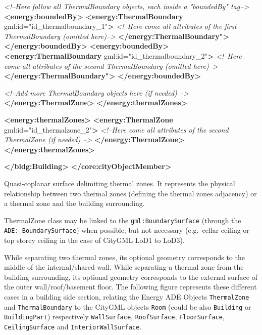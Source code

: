 \documentclass[a4paper,12pt]{article}
\newenvironment{Shaded}{}{}
\newcommand{\KeywordTok}[1]{\textcolor[rgb]{0.00,0.44,0.13}{\textbf{{#1}}}}
\newcommand{\StringTok}[1]{\textcolor[rgb]{0.25,0.44,0.63}{{#1}}}
\newcommand{\CommentTok}[1]{\textcolor[rgb]{0.38,0.63,0.69}{\textit{{#1}}}}
\newcommand{\OtherTok}[1]{\textcolor[rgb]{0.00,0.44,0.13}{{#1}}}
\newcommand{\ErrorTok}[1]{\textcolor[rgb]{1.00,0.00,0.00}{\textbf{{#1}}}}
\begin{document}
\begin{Shaded}
\begin{Highlighting}[]
                \CommentTok{<!--Here follow all ThermalBoundary objects, each inside a "boundedBy" tag-->}
                \KeywordTok{<energy:boundedBy>}
                    \KeywordTok{<energy:ThermalBoundary}\OtherTok{ gml:id=}\StringTok{"id_thermalboundary_1"}\KeywordTok{>}
                        \CommentTok{<!--Here come all attributes of the first ThermalBoundary (omitted here)-->}
                    \KeywordTok{</energy:ThermalBoundary}\ErrorTok{"}\KeywordTok{>}
                \KeywordTok{</energy:boundedBy>}
                \KeywordTok{<energy:boundedBy>}
                    \KeywordTok{<energy:ThermalBoundary}\OtherTok{ gml:id=}\StringTok{"id_thermalboundary_2"}\KeywordTok{>}
                        \CommentTok{<!--Here come all attributes of the second ThermalBoundary (omitted here)-->}
                    \KeywordTok{</energy:ThermalBoundary}\ErrorTok{"}\KeywordTok{>}
                \KeywordTok{</energy:boundedBy>}
                
                \CommentTok{<!--Add more ThermalBoundary objects here (if needed) -->}
            \KeywordTok{</energy:ThermalZone>}
        \KeywordTok{</energy:thermalZones>}

        \KeywordTok{<energy:thermalZones>}
            \KeywordTok{<energy:ThermalZone}\OtherTok{ gml:id=}\StringTok{"id_thermalzone_2"}\KeywordTok{>}
                \CommentTok{<!--Here come all attributes of the second ThermalZone (if needed) -->}
            \KeywordTok{</energy:ThermalZone>}               
        \KeywordTok{</energy:thermalZones>}

        \KeywordTok{</bldg:Building>}
\KeywordTok{</core:cityObjectMember>}
\end{Highlighting}
\end{Shaded}

Quasi-coplanar surface delimiting thermal zones. It represents the
physical relationship between two thermal zones (defining the thermal
zones adjacency) or a thermal zone and the building surrounding.

ThermalZone class may be linked to the \texttt{gml:BoundarySurface}
(through the \texttt{ADE:\_BoundarySurface}) when possible, but not
necessary (e.g.~cellar ceiling or top storey ceiling in the case of
CityGML LoD1 to LoD3).

While separating two thermal zones, its optional geometry corresponds to
the middle of the internal/shared wall. While separating a thermal zone
from the building surrounding, its optional geometry corresponds to the
external surface of the outer wall/roof/basement floor. The following
figure represents these different cases in a building side section,
relating the Energy ADE Objects \texttt{ThermalZone} and
\texttt{ThermalBoundary} to the CityGML objects \texttt{Room} (could be
also \texttt{Building} or \texttt{BuildingPart}) respectively
\texttt{WallSurface}, \texttt{RoofSurface}, \texttt{FloorSurface},
\texttt{CeilingSurface} and \texttt{InteriorWallSurface}.
\end{document}
